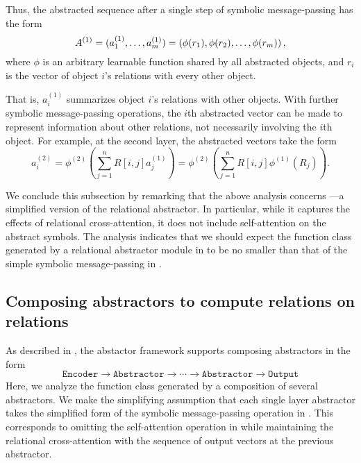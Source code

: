 Thus, the abstracted sequence after a single step of symbolic message-passing has the form
\begin{equation}
	\label{eq:abstracted_seq_1_layer_abstractor}
	A^{(1)} = (a_1^{(1)}, \ldots, a_\m^{(1)}) = \left(\phi(r_1), \phi(r_2), \ldots, \phi(r_\m)\right),
\end{equation}
where \(\phi\) is an arbitrary learnable function shared by all abstracted objects, and \(r_i\) is the vector of object \(i\)'s relations with every other object.

That is, \(a_i^{(1)}\) summarizes object \(i\)'s relations with other objects. With further symbolic message-passing operations, the \(i\)th abstracted vector can be made to represent information about other relations, not necessarily involving the \(i\)th object. For example, at the second layer, the abstracted vectors take the form
\begin{equation}
	a_i^{(2)} = \phi^{(2)} \left( \sum_{j=1}^{n} R[i,j] a_j^{(1)} \right) = \phi^{(2)} \left( \sum_{j=1}^{n} R[i,j] \phi^{(1)}(R_j) \right).
\end{equation}

We conclude this subsection by remarking that the above analysis concerns ---a simplified version of the relational  abstractor. In particular, while it captures the effects of relational cross-attention, it does not include self-attention on the abstract symbols. The analysis indicates that we should expect the function class generated by a relational  abstractor module in  to be no smaller than that of the simple symbolic message-passing in .


\subsection{Composing  abstractors to compute relations on relations}
\label{ssec:compsing_abstractors}

As described in , the abstactor framework supports composing  abstractors in the form
\begin{equation*}
	\texttt{Encoder} \to \texttt{Abstractor} \to \cdots \to \texttt{Abstractor} \to \texttt{Output}
\end{equation*}
Here, we analyze the function class generated by a composition of several abstractors. We make the simplifying assumption that each single layer abstractor takes the simplified form of the symbolic message-passing operation in . This corresponds to omitting the self-attention operation in  while maintaining the relational cross-attention with the sequence of output vectors at the previous  abstractor.

